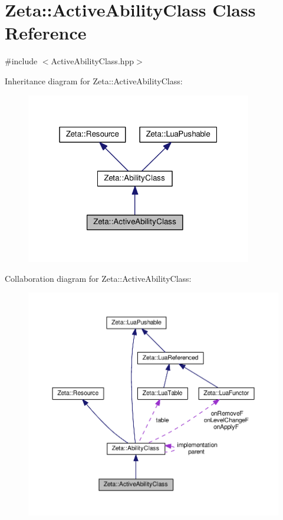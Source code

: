 \hypertarget{classZeta_1_1ActiveAbilityClass}{\section{Zeta\+:\+:Active\+Ability\+Class Class Reference}
\label{classZeta_1_1ActiveAbilityClass}
}


{\ttfamily \#include $<$Active\+Ability\+Class.\+hpp$>$}



Inheritance diagram for Zeta\+:\+:Active\+Ability\+Class\+:\nopagebreak
\begin{figure}[H]
\begin{center}
\leavevmode
\includegraphics[width=280pt]{classZeta_1_1ActiveAbilityClass__inherit__graph}
\end{center}
\end{figure}


Collaboration diagram for Zeta\+:\+:Active\+Ability\+Class\+:\nopagebreak
\begin{figure}[H]
\begin{center}
\leavevmode
\includegraphics[width=350pt]{classZeta_1_1ActiveAbilityClass__coll__graph}
\end{center}
\end{figure}
